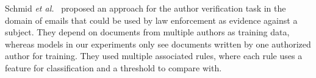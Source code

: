 \documentclass[11pt]{article}
\begin{document}
Schmid \emph{et al.}~\cite{Schmid:2015} proposed an approach for the
author verification task in the domain of emails that could be used by
law enforcement as evidence against a subject. They depend on
documents from multiple authors as training data, whereas models in
our experiments only see documents written by one authorized author
for training. They used multiple associated rules, where each rule
uses a feature for classification and a threshold to compare with.




\end{document}
